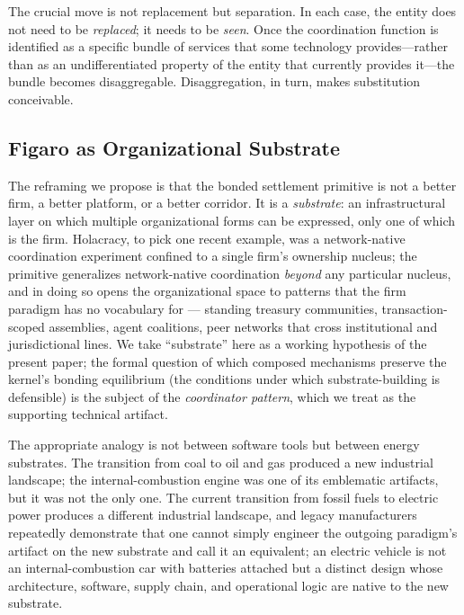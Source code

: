 \documentclass[11pt,a4paper]{article}
\theoremstyle{remark}
\begin{document}
The crucial move is not replacement but separation. In each case,
the entity does not need to be \emph{replaced}; it needs to be
\emph{seen}. Once the coordination function is identified as a
specific bundle of services that some technology
provides---rather than as an undifferentiated property of the
entity that currently provides it---the bundle becomes
disaggregable. Disaggregation, in turn, makes substitution
conceivable.

\subsection{Figaro as Organizational Substrate}
\label{sec:substrate}

The reframing we propose is that the bonded settlement primitive is
not a better firm, a better platform, or a better corridor. It is a
\emph{substrate}: an infrastructural layer on which multiple
organizational forms can be expressed, only one of which is the
firm. Holacracy, to pick one recent example, was a network-native
coordination experiment confined to a single firm's ownership
nucleus; the primitive generalizes network-native coordination
\emph{beyond} any particular nucleus, and in doing so opens the
organizational space to patterns that the firm paradigm has no
vocabulary for --- standing treasury communities, transaction-scoped
assemblies, agent coalitions, peer networks that cross institutional
and jurisdictional lines. We take ``substrate'' here as a working
hypothesis of the present paper; the formal question of which
composed mechanisms preserve the kernel's bonding equilibrium (the
conditions under which substrate-building is defensible) is the
subject of the \emph{coordinator pattern}, which we treat as the
supporting technical artifact.

The appropriate analogy is not between software tools but between
energy substrates. The transition from coal to oil and gas produced
a new industrial landscape; the internal-combustion engine was one
of its emblematic artifacts, but it was not the only one. The
current transition from fossil fuels to electric power produces a
different industrial landscape, and legacy manufacturers
repeatedly demonstrate that one cannot simply engineer the
outgoing paradigm's artifact on the new substrate and call it an
equivalent; an electric vehicle is not an internal-combustion car
with batteries attached but a distinct design whose architecture,
software, supply chain, and operational logic are native to the
new substrate.
\end{document}
